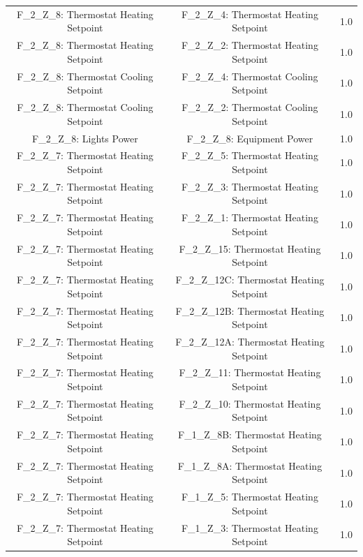 \documentclass[aps, 10pt, a4paper]{article}
\begin{document}
\begin{longtable}{c|c||c}
                    F\_2\_Z\_8: Thermostat Heating Setpoint & F\_2\_Z\_4: Thermostat Heating Setpoint & 1.0 \\
                    F\_2\_Z\_8: Thermostat Heating Setpoint & F\_2\_Z\_2: Thermostat Heating Setpoint & 1.0 \\
                    F\_2\_Z\_8: Thermostat Cooling Setpoint & F\_2\_Z\_4: Thermostat Cooling Setpoint & 1.0 \\
                    F\_2\_Z\_8: Thermostat Cooling Setpoint & F\_2\_Z\_2: Thermostat Cooling Setpoint & 1.0 \\
                    F\_2\_Z\_8: Lights Power & F\_2\_Z\_8: Equipment Power & 1.0 \\
                    F\_2\_Z\_7: Thermostat Heating Setpoint & F\_2\_Z\_5: Thermostat Heating Setpoint & 1.0 \\
                    F\_2\_Z\_7: Thermostat Heating Setpoint & F\_2\_Z\_3: Thermostat Heating Setpoint & 1.0 \\
                    F\_2\_Z\_7: Thermostat Heating Setpoint & F\_2\_Z\_1: Thermostat Heating Setpoint & 1.0 \\
                    F\_2\_Z\_7: Thermostat Heating Setpoint & F\_2\_Z\_15: Thermostat Heating Setpoint & 1.0 \\
                    F\_2\_Z\_7: Thermostat Heating Setpoint & F\_2\_Z\_12C: Thermostat Heating Setpoint & 1.0 \\
                    F\_2\_Z\_7: Thermostat Heating Setpoint & F\_2\_Z\_12B: Thermostat Heating Setpoint & 1.0 \\
                    F\_2\_Z\_7: Thermostat Heating Setpoint & F\_2\_Z\_12A: Thermostat Heating Setpoint & 1.0 \\
                    F\_2\_Z\_7: Thermostat Heating Setpoint & F\_2\_Z\_11: Thermostat Heating Setpoint & 1.0 \\
                    F\_2\_Z\_7: Thermostat Heating Setpoint & F\_2\_Z\_10: Thermostat Heating Setpoint & 1.0 \\
                    F\_2\_Z\_7: Thermostat Heating Setpoint & F\_1\_Z\_8B: Thermostat Heating Setpoint & 1.0 \\
                    F\_2\_Z\_7: Thermostat Heating Setpoint & F\_1\_Z\_8A: Thermostat Heating Setpoint & 1.0 \\
                    F\_2\_Z\_7: Thermostat Heating Setpoint & F\_1\_Z\_5: Thermostat Heating Setpoint & 1.0 \\
                    F\_2\_Z\_7: Thermostat Heating Setpoint & F\_1\_Z\_3: Thermostat Heating Setpoint & 1.0 \\

\end{longtable}
\end{document}
